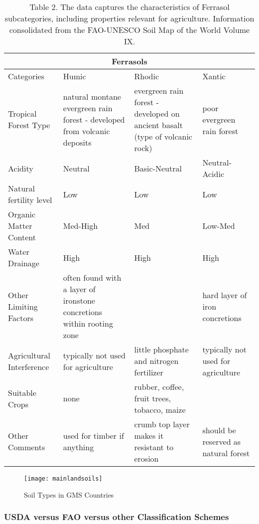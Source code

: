 \begin{table}
\begin{center}   
    \begin{tabular}{ | p{5cm} | p{3cm} | p{3cm} | p{3cm} |}
    \hline
    \multicolumn{4}{|c|}{Ferrasols} \\
    \hline
    Categories & Humic & Rhodic & Xantic \\ \hline
    Tropical Forest Type & natural montane evergreen rain forest - developed from volcanic deposits & evergreen rain forest - developed on ancient basalt (type of volcanic rock) & poor evergreen rain forest\\ \hline
    Acidity & Neutral & Basic-Neutral & Neutral-Acidic \\ \hline
    Natural fertility level & Low & Low & Low \\ \hline
    Organic Matter Content & Med-High & Med & Low-Med \\ \hline
    Water Drainage & High & High & High \\ \hline
    Other Limiting Factors & often found with a layer of ironstone concretions within rooting zone & & hard layer of iron concretions\\ \hline
    Agricultural Interference & typically not used for agriculture & little phosphate and nitrogen fertilizer & typically not used for agriculture\\ \hline
    Suitable Crops & none & rubber, coffee, fruit trees, tobacco, maize & \\ \hline
    Other Comments & used for timber if anything & crumb top layer makes it resistant to erosion & should be reserved as natural forest\\ 
    \hline
    \end{tabular}
    \caption{Table 2. The data captures the characteristics of Ferrasol subcategories, including properties relevant for agriculture. Information consolidated from the FAO-UNESCO Soil Map of the World Volume IX.}
\end{center}
\end{table}

\begin{figure}
\texttt{[image: mainlandsoils]}
\caption{Soil Types in GMS Countries}
\label{fig:mainlandsoils}
\end{figure}

\subsubsection{USDA versus FAO versus other Classification Schemes}

